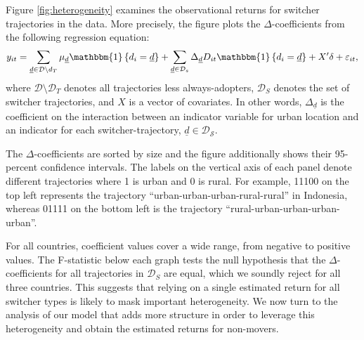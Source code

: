 Figure \ref{fig:heterogeneity} examines the observational returns for switcher trajectories in the data. 
More precisely, the figure plots the $\Delta$-coefficients from the following regression equation: 
\begin{equation}
    y_{i t} = \sum_{\underline{d} \in \mathcal{D} \setminus d_{T}} \mu_{\underline{d}} \mathbbm{1} \left\{d_{i}=\underline{d} \right\} + \sum_{\underline{d} \in \mathcal{D}_{s}} \Delta_{\underline{d}} D_{i t} \mathbbm{1} \left\{d_{i}=\underline{d} \right\} + X'\delta +\varepsilon_{i t}, 
\end{equation}
\noindent where $\mathcal{D} \setminus \mathcal{D}_{T}$ denotes all trajectories less always-adopters, $\mathcal{D}_{S}$ denotes the set of switcher trajectories, and $X$ is a vector of covariates. 
In other words, $\Delta_{\underline{d}}$ is the coefficient on the interaction between an indicator variable for urban location and an indicator for each switcher-trajectory, $\underline{d} \in \mathcal{D_{S}}$.

The $\Delta$-coefficients are sorted by size and the figure additionally shows their 95-percent confidence intervals. The labels on the vertical axis of each panel denote different trajectories where 1 is urban and 0 is rural. For example, 11100 on the top left represents the trajectory ``urban-urban-urban-rural-rural'' in Indonesia, whereas 01111 on the bottom left is the trajectory ``rural-urban-urban-urban-urban''. 

For all countries, coefficient values cover a wide range, from negative to positive values. 
The F-statistic below each graph tests the null hypothesis that the $\Delta$-coefficients for all trajectories in $\mathcal{D}_{S}$ are equal, which we soundly reject for all three countries. 
This suggests that relying on a single estimated return for all switcher types is likely to mask important heterogeneity.
We now turn to the analysis of our model that adds more structure in order to leverage this heterogeneity and obtain the estimated returns for non-movers.



